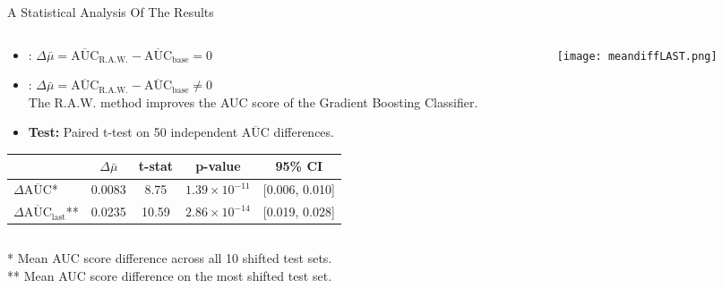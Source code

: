 \begin{frame}{A Statistical Analysis Of The Results}
    \begin{columns}[T]
        \begin{column}{0.6\textwidth}
            \begin{itemize}
                \item {}: $\Delta\bar{\mu} = \overline{\text{AUC}}_{\text{R.A.W.}} - \overline{\text{AUC}}_{\text{base}} = 0$ \\        
                \item {}: $\Delta\bar{\mu} = \overline{\text{AUC}}_{\text{R.A.W.}} - \overline{\text{AUC}}_{\text{base}} \neq 0$ \\
                \quad The R.A.W. method improves the AUC score of the Gradient Boosting Classifier.
                
                \item \textbf{Test:} Paired t-test on 50 independent $\overline{\text{AUC}}$ differences.
            \end{itemize}
            
            \vspace{0.5em}
            
            \begin{table}
                \centering
                \small
                \begin{tabular}{lcccc}
                    \toprule
                    & $\Delta\bar{\mu}$ & t-stat & p-value & 95\% CI \\
                    \midrule
                    $\Delta\overline{\text{AUC}}$* & 0.0083 & 8.75  & $1.39 \times 10^{-11}$ & [0.006, 0.010] \\
                    $\Delta\overline{\text{AUC}}_{\text{last}}$** & 0.0235 & 10.59 & $2.86 \times 10^{-14}$ & [0.019, 0.028] \\
                    \bottomrule
                \end{tabular}
            \end{table}
        \end{column}
        
        \begin{column}{0.4\textwidth}
            \begin{figure}
                \texttt{[image: meandiffLAST.png]}
            \end{figure}
        \end{column}
    \end{columns}
    
    \begin{footnotesize}
        * Mean AUC score difference across all 10 shifted test sets. \\
        ** Mean AUC score difference on the most shifted test set.
    \end{footnotesize}
\end{frame}


    
